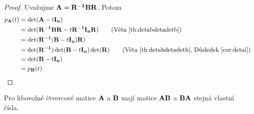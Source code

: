 \begin{proof}
    Uvažujme $\mathbf{A} = \mathbf{R^{-1}} \mathbf{B} \mathbf{R}$. Potom 
    \begin{align*}
        p_\mA(t) &= \det(\mA-t\mIn) \\
                 &= \det(\mRi \mB \mR - t \mRi \mIn \mR) 
                    \tag{Věta~\ref{th:detabdetadetb}}\\
                 &= \det(\mRi (\mB - t\mIn) \mR) \\
                 &= \det(\mRi) \det(\mB - t\mIn) \det(\mR)
                    \tag{Věta~\ref{th:detabdetadetb}, 
                        Důsledek~\ref{cor:detai}}\\
                 &= \det(\mB -t\mIn) \\
                 &= p_\mB(t)
    \end{align*}
\end{proof}

\begin{proposition}
    Pro libovolné čtvercové matice $\mathbf{A}$ a $\mathbf{B}$ mají matice $\mathbf{A}\mathbf{B}$
    a $\mathbf{B}\mathbf{A}$ stejná vlastní čísla.
\end{proposition}

